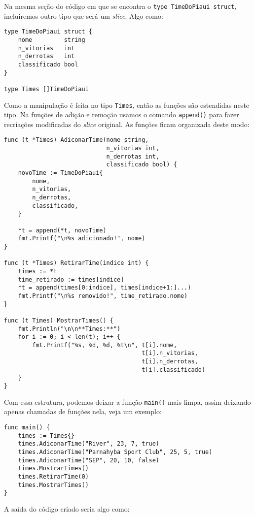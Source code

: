\documentclass{SBCbookchapter}
\begin{document}
Na mesma seção do código em que se encontra o \texttt{type TimeDoPiaui struct}, incluiremos outro tipo que será um \textit{slice}. Algo como:

\begin{lstlisting}
type TimeDoPiaui struct {
	nome         string
	n_vitorias   int
	n_derrotas   int
	classificado bool
}

type Times []TimeDoPiaui
\end{lstlisting}

Como a manipulação é feita no tipo \texttt{Times}, então as funções são estendidas neste tipo. Na funções de adição e remoção usamos o comando \texttt{append()} para fazer recriações modificadas do \textit{slice} original. As funções ficam organizada deste modo:

\begin{lstlisting}
func (t *Times) AdiconarTime(nome string,
							 n_vitorias int,
							 n_derrotas int,
							 classificado bool) {
	novoTime := TimeDoPiaui{
		nome,
		n_vitorias,
		n_derrotas,
		classificado,
	}

	*t = append(*t, novoTime)
	fmt.Printf("\n%s adicionado!", nome)
}

func (t *Times) RetirarTime(indice int) {
	times := *t
	time_retirado := times[indice]
	*t = append(times[0:indice], times[indice+1:]...)
	fmt.Printf("\n%s removido!", time_retirado.nome)
}

func (t Times) MostrarTimes() {
	fmt.Println("\n\n**Times:**")
	for i := 0; i < len(t); i++ {
		fmt.Printf("%s, %d, %d, %t\n", t[i].nome,
									   t[i].n_vitorias,
									   t[i].n_derrotas,
									   t[i].classificado)
	}
}
\end{lstlisting}

Com essa estrutura, podemos deixar a função \texttt{main()} mais limpa, assim deixando apenas chamadas de funções nela, veja um exemplo:

\begin{lstlisting}
func main() {
	times := Times{}
	times.AdiconarTime("River", 23, 7, true)
	times.AdiconarTime("Parnahyba Sport Club", 25, 5, true)
	times.AdiconarTime("SEP", 20, 10, false)
	times.MostrarTimes()
	times.RetirarTime(0)
	times.MostrarTimes()
}
\end{lstlisting}

A saída do código criado seria algo como:
\end{document}
